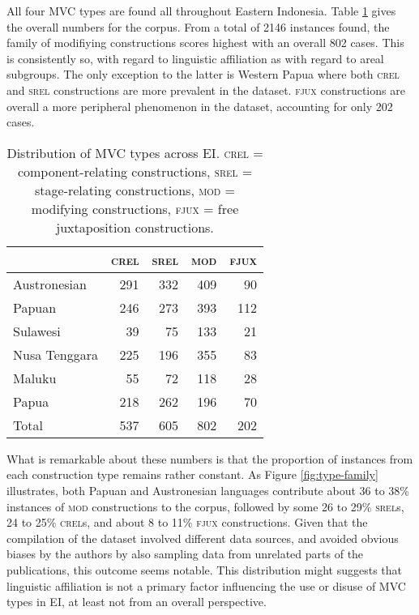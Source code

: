 All four MVC types are found all throughout Eastern Indonesia. Table \ref{table:MVCtypes_overview} gives the overall numbers for the corpus. From a total of 2146 instances found, the family of modifiying constructions scores highest with an overall 802 cases. This is consistently so, with regard to linguistic affiliation as with regard to areal subgroups. The only exception to the latter is Western Papua where both \textsc{crel} and \textsc{srel} constructions are more prevalent in the dataset. \textsc{fjux} constructions are overall a more peripheral phenomenon in the dataset, accounting for only 202 cases.

\begin{table}


\begin{tabular}{lrrrr}
  \lsptoprule
 & \textsc{crel} & \textsc{srel} & \textsc{mod} & \textsc{fjux} \tabularnewline 
  \hline
  Austronesian & 291 & 332 & 409 & 90 \tabularnewline
  Papuan & 246 & 273 &  393 &  112  \tabularnewline
   \hline
  Sulawesi & 39 & 75 & 133 & 21 \tabularnewline
  Nusa Tenggara & 225 & 196 & 355 & 83 \tabularnewline
  Maluku & 55 & 72 & 118 & 28 \tabularnewline 
  Papua & 218 & 262 & 196 & 70 \tabularnewline 
\lsptoprule
Total & 537 & 605 & 802 & 202 \tabularnewline
\hline
\end{tabular}
\caption[Distribution of MVC types]{Distribution of MVC types across EI. \textsc{crel} = component-relating constructions, \textsc{srel} = stage-relating constructions, \textsc{mod} = modifying constructions, \textsc{fjux} = free juxtaposition constructions.}
\label{table:MVCtypes_overview}


\end{table}


What is remarkable about these numbers is that the proportion of instances from each construction type remains rather constant. As Figure \ref{fig:type-family} illustrates, both Papuan and Austronesian languages contribute about 36 to 38\% instances of \textsc{mod} constructions to the corpus, followed by some 26 to 29\% \textsc{srel}s, 24 to 25\% \textsc{crel}s, and about 8 to 11\% \textsc{fjux} constructions. Given that the compilation of the dataset involved different data sources, and avoided obvious biases by the authors by also sampling data from unrelated parts of the publications, this outcome seems notable. This distribution might suggests that linguistic affiliation is not a primary factor influencing the use or disuse of MVC types in EI, at least not from an overall perspective.

